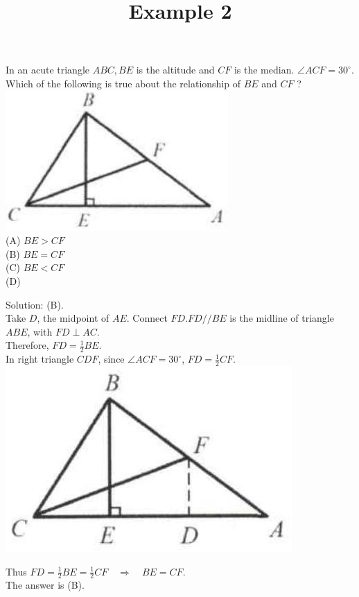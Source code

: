 \documentclass{article}
\title{Example 2}
\date{}
\begin{document}
\maketitle

In an acute triangle \(A B C, B E\) is the altitude and \(C F\) is the median. \(\angle A C F=30^{\circ}\). Which of the following is true about the relationship of \(B E\) and \(C F\) ?\\
\centering
\includegraphics[width=\textwidth]{images/problem_image_1.jpg}\\
(A) \(B E>C F\)\\
(B) \(B E=C F\)\\
(C) \(B E<C F\)\\
(D)

Solution: (B).\\
Take \(D\), the midpoint of \(A E\). Connect \(F D . F D / / B E\) is the midline of triangle \(A B E\), with \(F D \perp A C\).\\
Therefore, \(F D=\frac{1}{2} B E\).\\
In right triangle \(C D F\), since \(\angle A C F=30^{\circ}\), \(F D=\frac{1}{2} C F\).\\
\centering
\includegraphics[width=\textwidth]{images/reasoning_image_1.jpg}

Thus \(F D=\frac{1}{2} B E=\frac{1}{2} C F \quad \Rightarrow \quad B E=C F\).\\
The answer is (B).\\
\end{document}
